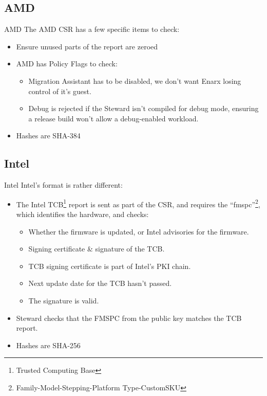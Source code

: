 \documentclass[graphics,compress]{beamer}
\begin{document}
\subsection{AMD}
\begin{frame}{AMD}
The AMD CSR has a few specific items to check:
\begin{itemize}
    \item Ensure unused parts of the report are zeroed
    \item AMD has Policy Flags to check:
    \begin{itemize}
        \item Migration Assistant has to be disabled, we don't want Enarx losing control of it's guest.
        \item Debug is rejected if the Steward isn't compiled for debug mode, ensuring a release build won't allow a debug-enabled workload.
    \end{itemize}
    \item Hashes are SHA-384
\end{itemize}
\end{frame}

\subsection{Intel}
\begin{frame}{Intel}
Intel's format is rather different:
\begin{itemize}
    \item The Intel TCB\footnote{Trusted Computing Base} report is sent as part of the CSR, and requires the ``fmspc''\footnote{Family-Model-Stepping-Platform Type-CustomSKU}, which identifies the hardware, and checks:
    \begin{itemize}
        \item Whether the firmware is updated, or Intel advisories for the firmware.
        \item Signing certificate \& signature of the TCB.
        \item TCB signing certificate is part of Intel's PKI chain.
        \item Next update date for the TCB hasn't passed.
        \item The signature is valid.
    \end{itemize}
    \item Steward checks that the FMSPC from the public key matches the TCB report.
    \item Hashes are SHA-256
\end{itemize}
\end{frame}
\end{document}
